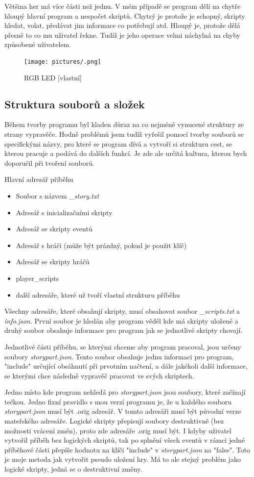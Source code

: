 \documentclass[12pt,a4paper]{article}
\begin{document}
Většina her má více části než jednu. V mém případě se program dělí na chytře hloupý hlavní program a nespočet skriptů. Chytrý je protože je schopný, skripty hledat, volat, předávat jim informace co potřebují atd. Hloupý je, protože dělá přesně to co mu uživatel řekne. Tudíž je jeho operace velmi náchylná na chyby způsobené uživatelem.

\begin{figure}[H]
    \centering
    \texttt{[image: pictures/.png]}
    \caption{RGB LED [vlastní]}
\end{figure}

\subsection{Struktura souborů a složek}
Během tvorby programu byl kladen důraz na co nejméně vynucené struktury ze strany vypravěče. Hodně problémů jsem tudíž vyřešil pomocí tvorby souborů se specifickými názvy, pro které se program dívá a vytvoří si strukturu cest, se kterou pracuje a podává do dalších funkcí. Je zde ale určitá kultura, kterou bych doporučil při tvoření souborů.

Hlavní adresář příběhu
\begin{itemize}
	\item Soubor s názvem \textit{\_story.txt}
	\item Adresář s inicializačními skripty
	\item Adresář se skripty eventů
	\item Adresář s hráči (může být prázdný, pokud je použit klíč)
	\item Adresář se skripty hráčů 
	\item player\_scripts
	\item další adresáře, které už tvoří vlastní strukturu příběhu
\end{itemize}

Všechny adresáře, které obsahují skripty, musí obsahovat soubor \textit{\_scripts.txt} a \textit{info.json}. První soubor je hledán aby program věděl kde má skripty uložené a druhý soubor obsahuje informace pro program jak se jednotlivé skripty chovají.

Jednotlivé části příběhu, se kterými chceme aby program pracoval, jsou určeny soubory \textit{storypart.json}. Tento soubor obsahuje jednu informaci pro program, "include" určující obsáhnutí při prvotním načtení, a dále jakékoli další informace, se kterými chce následně vypravěč pracovat ve svých skriptech.

Jedno místo kde program nehledá pro \textit{storypart.json} jsou soubory, které začínají tečkou. Jedno fixní pravidlo s mou verzí programu je, že u každého souboru \textit{storypart.json} musí být .orig adresář. V tomto adresáři musí být původní verze mateřského adresáře. Logické skripty přepisují soubory destruktivně (bez možnosti vrácení změn), proto zde adresáře .orig musí být. I kdyby uživatel vytvořil příběh bez logických skriptů, tak po splnění všech eventů v rámci jedné příběhové části přepíše hodnotu na klíči "include" v \textit{storypart.json} na "false". Toto je moje metoda jak vytvořit pseudo uložení hry. Má to ale stejný problém jako logické skripty, jedná se o destruktivní změny.
\end{document}
